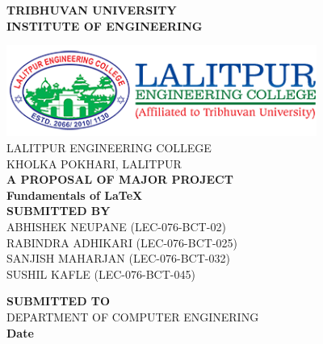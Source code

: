 \documentclass[12pt,titlepage]{article}
\begin{document}
\centering
{\fontsize{16 pt}{12} \selectfont\textbf{TRIBHUVAN UNIVERSITY} \\
    \textbf{INSTITUTE OF ENGINEERING}} \\
\vspace{0.3 in}

\includegraphics[width= 4in ]{leclogo21.png} \\
\vspace{0.05 in}
LALITPUR ENGINEERING COLLEGE \\
KHOLKA POKHARI, LALITPUR \\

\vspace{0.5 in}
\textbf{ A PROPOSAL OF MAJOR PROJECT}\\
{\fontsize{14 pt}{12} \selectfont \textbf{Fundamentals of \LaTeX}}\\
\vspace{1.1 in}
\textbf{ SUBMITTED BY}  \\
ABHISHEK NEUPANE (LEC-076-BCT-02)   \\
RABINDRA ADHIKARI (LEC-076-BCT-025) \\
SANJISH MAHARJAN (LEC-076-BCT-032)  \\
SUSHIL KAFLE (LEC-076-BCT-045)  \\

\vspace{1.1 in}

\textbf{ SUBMITTED TO}  \\
DEPARTMENT OF COMPUTER ENGINERING \\
\vspace{0.5 in}
\textbf{Date}
\end{document}
